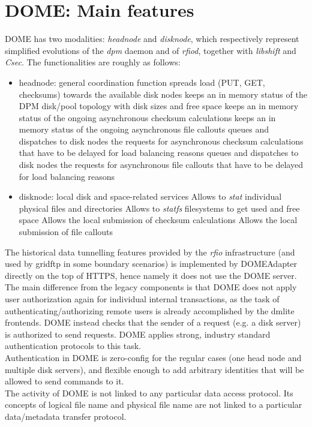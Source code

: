\documentclass[a4paper]{jpconf}
\begin{document}
\section{DOME: Main features}
DOME has two modalities: \textit{headnode} and \textit{disknode}, which respectively represent
simplified evolutions of the \textit{dpm} daemon and of \textit{rfiod}, together with \textit{libshift} and \textit{Csec}.
The functionalities are roughly as follows:
\begin{itemize}
 \item headnode: general coordination function
 \subitem spreads load (PUT, GET, checksums) towards the available disk nodes
 \subitem keeps an in memory status of the DPM disk/pool topology with disk sizes and free space
 \subitem keeps an in memory status of the ongoing asynchronous checksum calculations
 \subitem keeps an in memory status of the ongoing asynchronous file callouts
 \subitem queues and dispatches to disk nodes the requests for asynchronous checksum calculations that have to be delayed for load balancing reasons
 \subitem queues and dispatches to disk nodes the requests for asynchronous file callouts that have to be delayed for load balancing reasons

 \item disknode: local disk and space-related services
 \subitem Allows to \textit{stat} individual physical files and directories
 \subitem Allows to \textit{statfs} filesystems to get used and free space
 \subitem Allows the local submission of checksum calculations
 \subitem Allows the local submission of file callouts
\end{itemize}

The historical data tunnelling features provided by the \textit{rfio} infrastructure (and used by gridftp in some boundary scenarios) \cite{rfio}
is implemented by DOMEAdapter directly on the top of HTTPS, hence namely it does not use the DOME server.\\

The main difference from the legacy components is that DOME does not apply user authorization again for individual internal
transactions, as the task of authenticating/authorizing remote users is already accomplished by the dmlite frontends.
DOME instead checks that the sender of a request (e.g. a disk server) is authorized to
send requests. DOME applies strong, industry standard authentication protocols to this task.\\
Authentication in DOME is zero-config for the regular cases (one head node and multiple disk servers), and flexible enough
to add arbitrary identities that will be allowed to send commands to it.\\
The activity of DOME is not linked to any particular data access protocol. Its concepts of logical file name and physical file name are not linked to a particular data/metadata transfer protocol.
\end{document}
